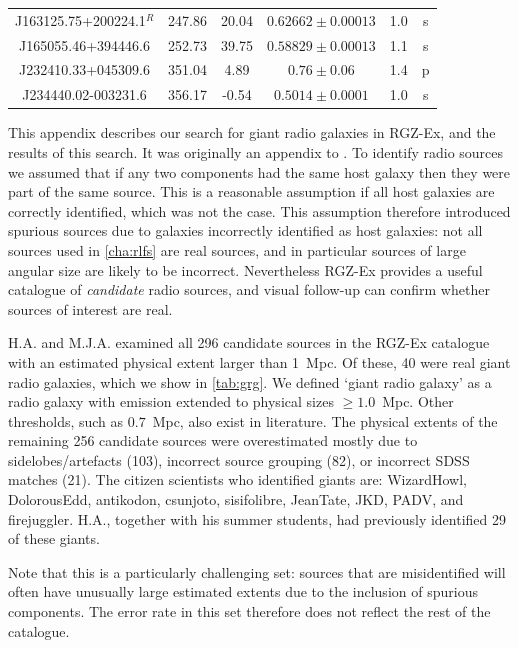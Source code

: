 \begin{table}
\begin{footnotesize}
\begin{tabular}{c|ccccc}
    J163125.75+200224.1${}^R$ & 247.86 & 20.04 & $0.62662 \pm 0.00013$ & 1.0 & s\\ %
    J165055.46+394446.6 & 252.73 & 39.75 & $0.58829 \pm 0.00013$ & 1.1 & s\\ %
    J232410.33+045309.6 & 351.04 & 4.89 & $0.76 \pm 0.06$ & 1.4 & p\\ %
    J234440.02-003231.6 & 356.17 & -0.54 & $0.5014 \pm 0.0001$ & 1.0 & s\\ %
      \hline\hline
      \end{tabular}\end{footnotesize}
    \end{table}

    This appendix describes our search for giant radio galaxies in RGZ-Ex, and the results of this search. It was originally an appendix to \citet{alger21rlfs}. To identify radio sources we assumed that if any two components had the same host galaxy then they were part of the same source. This is a reasonable assumption if all host galaxies are correctly identified, which was not the case. This assumption therefore introduced spurious sources due to galaxies incorrectly identified as host galaxies: not all sources used in \autoref{cha:rlfs} are real sources, and in particular sources of large angular size are likely to be incorrect. Nevertheless RGZ-Ex provides a useful catalogue of \emph{candidate} radio sources, and visual follow-up can confirm whether sources of interest are real.

    H.A. and M.J.A. examined all 296 candidate sources in the RGZ-Ex catalogue with an estimated physical extent larger than 1~Mpc. Of these, 40 were real giant radio galaxies, which we show in \autoref{tab:grg}. We defined `giant radio galaxy' as a radio galaxy with emission extended to physical sizes $\geq 1.0$~Mpc. Other thresholds, such as $0.7$~Mpc, also exist in literature. The physical extents of the remaining 256 candidate sources were overestimated
mostly due to sidelobes/artefacts (103), incorrect source grouping (82), or incorrect SDSS matches (21). The citizen scientists who identified giants are: WizardHowl, DolorousEdd, antikodon, csunjoto, sisifolibre, JeanTate, JKD, PADV, and firejuggler. H.A., together with his summer students, had previously identified 29 of these giants.

    Note that this is a particularly challenging set: sources that are misidentified will often have unusually large estimated extents due to the inclusion of spurious components. The error rate in this set therefore does not reflect the rest of the catalogue.

